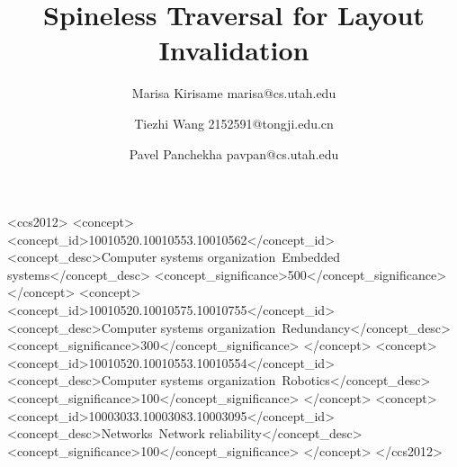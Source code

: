 \documentclass[format=acmsmall, review=true, screen=true]{acmart}
\begin{document}
\title[Spineless]{Spineless Traversal for Layout Invalidation}  
\author{Marisa Kirisame {marisa@cs.utah.edu}}
\author{Tiezhi Wang {2152591@tongji.edu.cn}}
\author{Pavel Panchekha {pavpan@cs.utah.edu}}

\begin{abstract}

\end{abstract}



%
%
\begin{CCSXML}
<ccs2012>
 <concept>
  <concept_id>10010520.10010553.10010562</concept_id>
  <concept_desc>Computer systems organization~Embedded systems</concept_desc>
  <concept_significance>500</concept_significance>
 </concept>
 <concept>
  <concept_id>10010520.10010575.10010755</concept_id>
  <concept_desc>Computer systems organization~Redundancy</concept_desc>
  <concept_significance>300</concept_significance>
 </concept>
 <concept>
  <concept_id>10010520.10010553.10010554</concept_id>
  <concept_desc>Computer systems organization~Robotics</concept_desc>
  <concept_significance>100</concept_significance>
 </concept>
 <concept>
  <concept_id>10003033.10003083.10003095</concept_id>
  <concept_desc>Networks~Network reliability</concept_desc>
  <concept_significance>100</concept_significance>
 </concept>
</ccs2012>  
\end{CCSXML}


%
%
\end{document}
